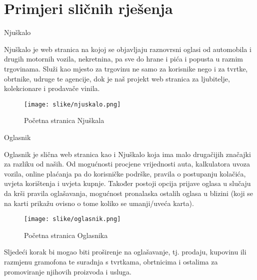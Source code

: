 	 
	 \section {Primjeri sličnih rješenja}
	 
	 \begin{packed_enum}
	 		\item Njuškalo
	 		
	 		\text Njuškalo je web stranica na kojoj se objavljaju raznovrsni oglasi od automobila i drugih motornih vozila,  nekretnina, pa sve do hrane i pića i popusta u raznim trgovinama. Služi kao mjesto za trgovinu ne samo za korisnike nego i za tvrtke, obrtnike, udruge te agencije, dok je naš projekt web stranica za ljubitelje, kolekcionare i prodavače vinila.\\
	 		
	 		\begin{figure}[H]
	 			\texttt{[image: slike/njuskalo.png]}
	 			\centering
	 			\caption{Početna stranica Njuškala}
	 			\label{fig:njuškalo}
	 		\end{figure}
	 		
	 		
		 	\item Oglasnik
	 		
	 		\text Oglasnik je slična web stranica kao i Njuškalo koja ima malo drugačijih značajki za razliku od naših. Od mogućnosti procjene vrijednosti auta, kalkulatora uvoza vozila, online plaćanja pa do korisničke podrške, pravila o postupanju kolačića, uvjeta korištenja i uvjeta kupnje. Također postoji opcija prijave oglasa u slučaju da krši pravila oglašavanja, mogućnost pronalaska ostalih oglasa u blizini (koji se na karti prikažu ovisno o tome koliko se umanji/uveća karta). \\
	 		
	 		\begin{figure}[H]
	 			\texttt{[image: slike/oglasnik.png]}
	 			\centering
	 			\caption{Početna stranica Oglasnika}
	 			\label{fig:oglasnik}
	 		\end{figure}
	 		
	 	\end{packed_enum}
	 		
	 		\text Sljedeći korak bi mogao biti proširenje na oglašavanje, tj. prodaju, kupovinu ili razmjenu gramofona te suradnja s tvrtkama, obrtnicima i ostalima za promoviranje njihovih proizvoda i usluga.
	 		
